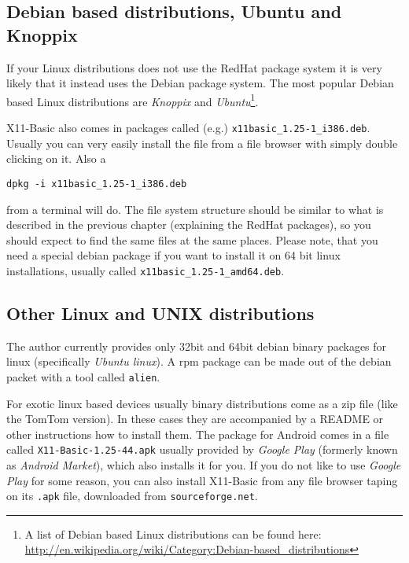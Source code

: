 \subsection*{Debian based distributions, Ubuntu and Knoppix}

If your Linux distributions does not use the RedHat package system it is very
likely that it instead uses the Debian package system. The most popular Debian
based Linux distributions are {\it Knoppix} and {\it Ubuntu}\footnote{A list of
Debian based Linux distributions can be found here:
\url{http://en.wikipedia.org/wiki/Category:Debian-based_distributions}}. 

X11-Basic also comes in packages called (e.g.)
\verb|x11basic_1.25-1_i386.deb|. Usually you can very easily install the file
from a file browser with simply double clicking on it. Also a 
\begin{verbatim}
dpkg -i x11basic_1.25-1_i386.deb
\end{verbatim} 
from a terminal will do. The file system structure should be similar
to what is described in the previous chapter (explaining the RedHat packages),
so you should expect to find the same files at the same places. Please note, 
that you need a special debian package if you want to install it on 64 bit linux
installations, usually called \verb|x11basic_1.25-1_amd64.deb|. 

\subsection*{Other Linux and UNIX distributions}

The author currently provides only 32bit and 64bit debian binary packages for 
linux (specifically {\it Ubuntu linux}). A
rpm package can be made out of the debian packet with a tool called
\verb|alien|. 

For exotic linux based devices usually binary distributions come as a zip file
(like the TomTom version). In these cases they are accompanied by a README or
other instructions how to install them. The  package for Android comes in a file
called \verb|X11-Basic-1.25-44.apk| usually  provided by {\it Google Play}
(formerly known as {\it Android Market}), which also installs it for you. If you
do not like to use {\it Google Play} for some reason, you can also install
X11-Basic from any file browser taping on its \verb|.apk| file, downloaded from
\verb|sourceforge.net|. 

